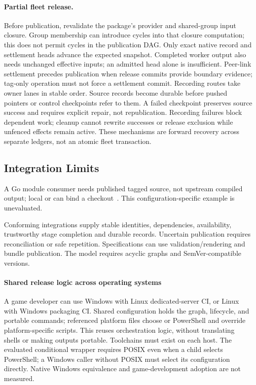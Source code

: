 \paragraph{Partial fleet release.}
Before publication, revalidate the package's provider and shared-group input
closure. Group membership can introduce cycles into that closure computation;
this does not permit cycles in the publication DAG. Only exact native record
and settlement heads advance the expected snapshot. Completed worker output
also needs unchanged effective inputs; an admitted head alone is insufficient.
Peer-link settlement precedes publication when release commits provide boundary
evidence; tag-only operation must not force a settlement commit. Recording
routes take owner lanes in stable order. Source records become durable before
pushed pointers or control checkpoints refer to them. A failed checkpoint
preserves source success and requires explicit repair, not republication.
Recording failures block dependent work; cleanup cannot rewrite successes or
release exclusion while unfenced effects remain active. These mechanisms are
forward recovery across separate ledgers, not an atomic fleet transaction.

\subsection{Integration Limits}

A Go module consumer needs published tagged source, not upstream compiled
output; local  or  can bind a checkout~\cite{gomod}.
This configuration-specific example is unevaluated.

Conforming integrations supply stable identities, dependencies, availability,
trustworthy stage completion and durable records. Uncertain publication requires
reconciliation or safe repetition. Specifications can use validation/rendering
and bundle publication. The model requires acyclic graphs and SemVer-compatible
versions.

\paragraph{Shared release logic across operating systems}
A game developer can use Windows with Linux dedicated-server CI, or Linux
with Windows packaging CI. Shared configuration holds the graph, lifecycle,
and portable commands; referenced platform files choose  or PowerShell
and override platform-specific scripts. This reuses orchestration logic,
without translating shells or making outputs portable. Toolchains must exist
on each host. The evaluated conditional wrapper requires POSIX even when a
child selects PowerShell; a Windows caller without POSIX must select its
configuration directly. Native Windows equivalence and game-development
adoption are not measured.

